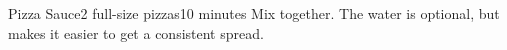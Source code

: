 \documentclass[../Cookbook.tex]{subfiles}
\begin{document}
\begin{recipe}[PizzaSauce]{Pizza Sauce}{2 full-size pizzas}{10 minutes}
	Mix together. The water is optional, but makes it easier to get a consistent spread.
\end{recipe}
\end{document}
